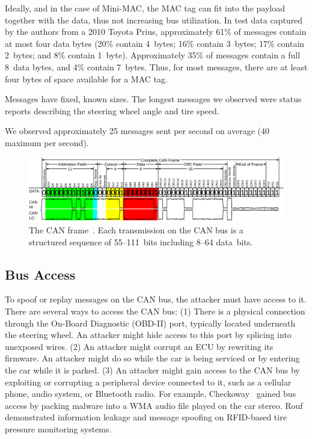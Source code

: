 Ideally, and in the case of Mini-MAC, the MAC tag
can fit into the payload together with the data, thus not increasing bus utilization. 
In test data captured by the authors from a 2010 Toyota Prius, 
approximately 61\% of messages contain at most four data bytes
(20\% contain 4~bytes; 16\% contain 3~bytes; 17\% contain 2~bytes; and 8\% contain 1~byte).
Approximately 35\% of messages contain a full 8~data bytes, and 4\% contain 7~bytes.
Thus, for most messages, there are at least four bytes of space available for a MAC tag.

Messages have fixed, known sizes.  The longest messages we observed were 
status reports describing the steering wheel angle and tire speed.

We observed approximately 25 messages sent per second on average (40 maximum per second).

	\begin{figure}
		\centering
		\includegraphics[width=\linewidth]{figures/can_frame.png}
		\caption{The CAN frame~\cite{fig1}.  
		Each transmission on the CAN bus is a structured sequence of 55--111~bits including 8--64 data~bits.}
		\label{fig-frame}
	\end{figure}

\subsection{Bus Access}
\label{access}

To spoof or replay messages on the CAN bus, the attacker must have access to it.
There are several ways to access the CAN bus:  (1) There is a
physical connection through the On-Board Diagnostic (OBD-II) port, 
typically located underneath the steering wheel.  An attacker might hide
access to this port by splicing into unexposed wires.
(2) An attacker might corrupt an ECU by rewriting its firmware. An attacker might
do so while the car is being serviced or by entering the car while it is parked.
(3) An attacker might gain access to the CAN bus by exploiting or corrupting a peripheral
device connected to it, such as a cellular phone, audio system, or Bluetooth
radio.  For example, Checkoway~\cite{Checkoway-2011} gained bus access by packing 
malware into a WMA audio file played on the car stereo. 
Rouf~\cite{Rouf2010} demonstrated information leakage and message spoofing on RFID-based tire pressure monitoring systems.

